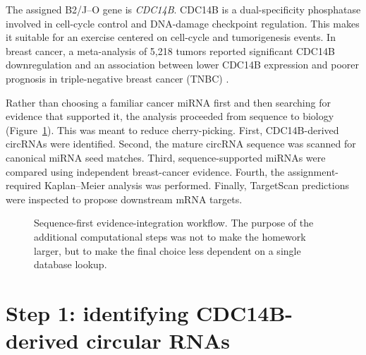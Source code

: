 \documentclass[11pt]{article}
\newcommand{\gene}[1]{\textit{#1}}
\begin{document}
The assigned B2/J--O gene is \gene{CDC14B}. CDC14B is a dual-specificity phosphatase involved in cell-cycle control and DNA-damage checkpoint regulation. This makes it suitable for an exercise centered on cell-cycle and tumorigenesis events. In breast cancer, a meta-analysis of 5,218 tumors reported significant CDC14B downregulation and an association between lower CDC14B expression and poorer prognosis in triple-negative breast cancer (TNBC) \cite{Li2020CDC14B}.

Rather than choosing a familiar cancer miRNA first and then searching for evidence that supported it, the analysis proceeded from sequence to biology (Figure~\ref{fig:workflow}). This was meant to reduce cherry-picking. First, CDC14B-derived circRNAs were identified. Second, the mature circRNA sequence was scanned for canonical miRNA seed matches. Third, sequence-supported miRNAs were compared using independent breast-cancer evidence. Fourth, the assignment-required Kaplan--Meier analysis was performed. Finally, TargetScan predictions were inspected to propose downstream mRNA targets.

\begin{figure}[ht]
\centering
{}
\caption{Sequence-first evidence-integration workflow. The purpose of the additional computational steps was not to make the homework larger, but to make the final choice less dependent on a single database lookup.}
\label{fig:workflow}
\end{figure}

\section{Step 1: identifying CDC14B-derived circular RNAs}
\end{document}
